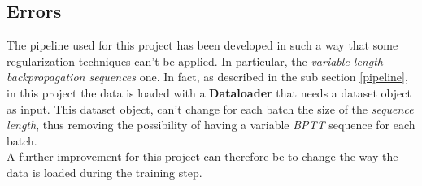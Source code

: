 \subsection{Errors} \label{errors}
The pipeline used for this project has been developed in such a way that some regularization techniques can't be applied. In particular, the \emph{variable length backpropagation sequences} one. In fact, as described in the sub section \ref{pipeline}, in this project the data is loaded with a \textbf{Dataloader} that needs a dataset object as input. This dataset object, can't change for each batch the size of the \emph{sequence length}, thus removing the possibility of having a variable \emph{BPTT} sequence for each batch.\\
A further improvement for this project can therefore be to change the way the data is loaded during the training step.
